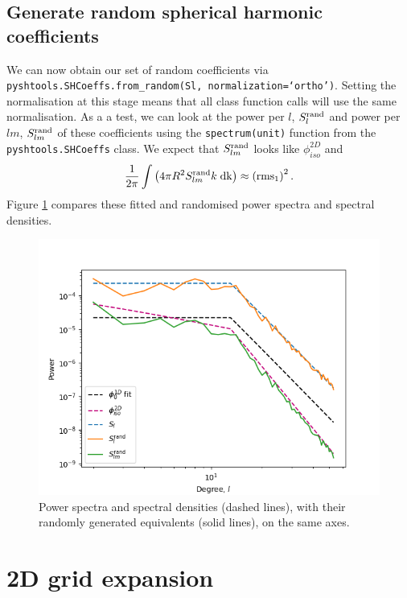 \documentclass[10pt]{article}
\begin{document}
\subsection{Generate random spherical harmonic coefficients} We can now obtain our set of random coefficients via \\ {\tt pyshtools.SHCoeffs.from{\_}random(Sl, normalization=`ortho')}. Setting the normalisation at this stage means that all class function calls will use the same normalisation. As a a test, we can look at the power per $l$, $S_l^{\rm rand}$ and power per $lm$, $S_{lm}^{\rm rand}$ of these coefficients using the {\tt spectrum(unit)} function from the {\tt pyshtools.SHCoeffs} class. We expect that $S_{lm}^{\rm rand}$ looks like $\phi^{2D}_{iso}$ and
\begin{equation} \label{eq:rand_rms_check}
\frac{1}{2\pi}\int\left(4 \pi R^2 S_{lm}^{\rm rand} k \; \rm{d}k \right) \approx \left({\rm rms_1}\right)^2.
\end{equation}
Figure \ref{fig:test_spectra} compares these fitted and randomised power spectra and spectral densities.

\begin{figure}[h]
\centering\includegraphics[width=1\linewidth]{random_spectra.png}
\caption{Power spectra and spectral densities (dashed lines), with their randomly generated equivalents (solid lines), on the same axes. \label{fig:test_spectra}}
\end{figure}

\section{2D grid expansion}
\end{document}
